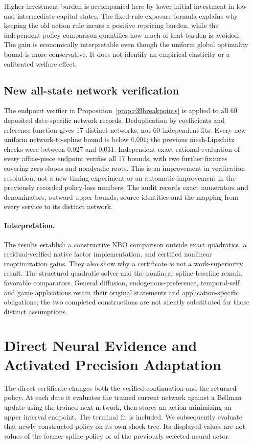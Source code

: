 \documentclass[ecta,nameyear,draft]{econsocart}
\theoremstyle{definition}
\theoremstyle{remark}
\begin{document}
Higher investment burden is accompanied here by lower initial investment in
low and intermediate capital states. The fixed-rule exposure formula explains
why keeping the old action rule incurs a positive repricing burden, while the
independent policy comparison quantifies how much of that burden is avoided.
The gain is economically interpretable even though the uniform global
optimality bound is more conservative. It does not identify an empirical
elasticity or a calibrated welfare effect.

\subsection{New all-state network verification}
The endpoint verifier in Proposition~\ref{prop:r39breakpoints} is applied to
all 60 deposited date-specific network records. Deduplication by coefficients
and reference function gives 17 distinct networks, not 60 independent fits.
Every new uniform network-to-spline bound is below $0.001$; the previous
mesh-Lipschitz checks were between $0.027$ and $0.031$. Independent exact
rational evaluation of every affine-piece endpoint verifies all 17 bounds,
with two further fixtures covering zero slopes and nondyadic roots.
This is an improvement in verification resolution, not a new timing experiment
or an automatic improvement in the previously recorded policy-loss numbers.
The audit records exact numerators and denominators, outward upper bounds,
source identities and the mapping from every service to its distinct network.

\paragraph{Interpretation.}
The results establish a constructive NBO comparison outside exact quadratics,
a residual-verified native factor implementation, and certified nonlinear
reoptimization gains. They also show why a certificate is not a work-superiority
result. The structural quadratic solver and the nonlinear spline baseline
remain favorable comparators. General diffusion, endogenous-preference,
temporal-self and game applications retain their original statements and
application-specific obligations; the two completed constructions are not
silently substituted for those distinct assumptions.

\section{Direct Neural Evidence and Activated Precision Adaptation}
\label{sec:r41evidence}
The direct certificate changes both the verified continuation and the
returned policy. At each date it evaluates the trained current network
against a Bellman update using the trained next network, then stores an
action minimizing an upper interval endpoint. The terminal fit is included.
We subsequently evaluate that newly constructed policy on its own shock
tree. Its displayed values are not values of the former spline policy or
of the previously selected neural actor.
\end{document}

